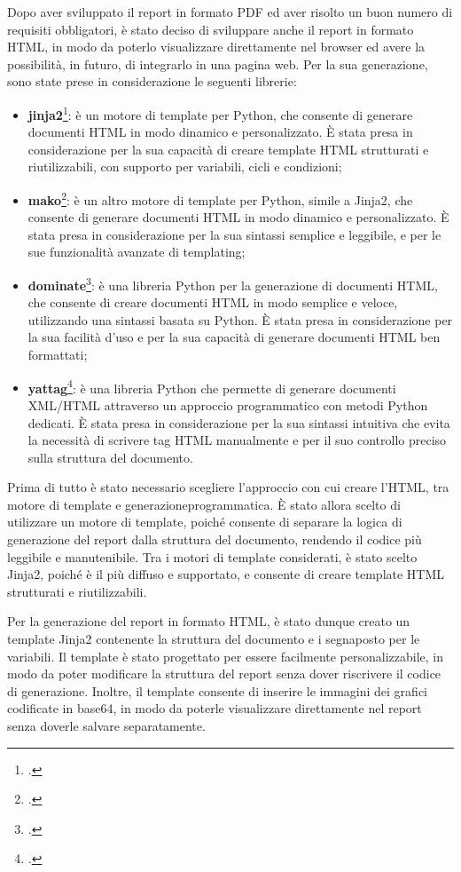 Dopo aver sviluppato il report in formato PDF ed aver risolto un buon numero di requisiti obbligatori, è stato deciso di sviluppare anche il report in formato HTML, in modo da poterlo visualizzare direttamente nel browser ed avere la possibilità, in futuro, di integrarlo in una pagina web. Per la sua generazione, sono state prese in considerazione le seguenti librerie:
\begin{itemize}
    \item \textbf{\gls{jinja2}}\footcite{site:jinja2}: è un motore di template per Python, che consente di generare documenti HTML in modo dinamico e personalizzato. È stata presa in considerazione per la sua capacità di creare template HTML strutturati e riutilizzabili, con supporto per variabili, cicli e condizioni;
    \item \textbf{\gls{mako}}\footcite{site:mako}: è un altro motore di template per Python, simile a Jinja2, che consente di generare documenti HTML in modo dinamico e personalizzato. È stata presa in considerazione per la sua sintassi semplice e leggibile, e per le sue funzionalità avanzate di templating;
    \item \textbf{\gls{dominate}}\footcite{site:dominate}: è una libreria Python per la generazione di documenti HTML, che consente di creare documenti HTML in modo semplice e veloce, utilizzando una sintassi basata su Python. È stata presa in considerazione per la sua facilità d'uso e per la sua capacità di generare documenti HTML ben formattati;
    \item \textbf{\gls{yattag}}\footcite{site:yattag}: è una libreria Python che permette di generare documenti XML/HTML attraverso un approccio programmatico con metodi Python dedicati. È stata presa in considerazione per la sua sintassi intuitiva che evita la necessità di scrivere tag HTML manualmente e per il suo controllo preciso sulla struttura del documento.
\end{itemize}

Prima di tutto è stato necessario scegliere l'approccio con cui creare l'HTML, tra motore di template e \gls{generazioneprogrammatica}. È stato allora scelto di utilizzare un motore di template, poiché consente di separare la logica di generazione del report dalla struttura del documento, rendendo il codice più leggibile e manutenibile. Tra i motori di template considerati, è stato scelto Jinja2, poiché è il più diffuso e supportato, e consente di creare template HTML strutturati e riutilizzabili.

Per la generazione del report in formato HTML, è stato dunque creato un template Jinja2 contenente la struttura del documento e i segnaposto per le variabili. Il template è stato progettato per essere facilmente personalizzabile, in modo da poter modificare la struttura del report senza dover riscrivere il codice di generazione. Inoltre, il template consente di inserire le immagini dei grafici codificate in base64, in modo da poterle visualizzare direttamente nel report senza doverle salvare separatamente.

